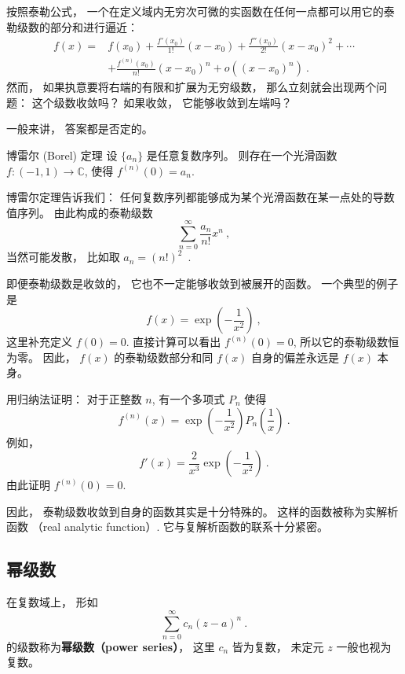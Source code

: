 

按照泰勒公式， 一个在定义域内无穷次可微的实函数在任何一点都可以用它的泰勒级数的部分和进行逼近：
$$
\begin{aligned}
f(x)=&f(x_0)+\frac{f'(x_0)}{1!}(x-x_0)+\frac{f''(x_0)}{2!}(x-x_0)^2+\cdots\\
&+\frac{f^{(n)}(x_0)}{n!}(x-x_0)^n+o((x-x_0)^n)~.
\end{aligned}
$$
然而， 如果执意要将右端的有限和扩展为无穷级数， 那么立刻就会出现两个问题： 这个级数收敛吗？ 如果收敛， 它能够收敛到左端吗？

一般来讲， 答案都是否定的。 

\begin{theorem}{博雷尔 (Borel) 定理}
设 $\{a_n\}$ 是任意复数序列。 则存在一个光滑函数 $f:(-1,1)\to\mathbb{C}$, 使得 $f^{(n)}(0)=a_n$.
\end{theorem}
博雷尔定理告诉我们： 任何复数序列都能够成为某个光滑函数在某一点处的导数值序列。 由此构成的泰勒级数
$$
\sum_{n=0}^\infty\frac{a_n}{n!}x^n~,
$$
当然可能发散， 比如取 $a_n=(n!)^2$~.

即便泰勒级数是收敛的， 它也不一定能够收敛到被展开的函数。 一个典型的例子是
$$
f(x)=\exp\left(-\frac{1}{x^2}\right)~,
$$
这里补充定义 $f(0)=0$. 直接计算可以看出 $f^{(n)}(0)=0$, 所以它的泰勒级数恒为零。 因此， $f(x)$ 的泰勒级数部分和同 $f(x)$ 自身的偏差永远是 $f(x)$ 本身。

\begin{exercise}{}
用归纳法证明： 对于正整数 $n$, 有一个多项式 $P_n$ 使得
$$
f^{(n)}(x)=\exp\left(-\frac{1}{x^2}\right)P_n\left(\frac{1}{x}\right)~.
$$
例如， 
$$
f'(x)=\frac{2}{x^3}\exp\left(-\frac{1}{x^2}\right)~.
$$
由此证明 $f^{(n)}(0)=0$.
\end{exercise}

因此， 泰勒级数收敛到自身的函数其实是十分特殊的。 这样的函数被称为实解析函数 （real analytic function）. 它与复解析函数的联系十分紧密。

\subsection{幂级数}
在复数域上， 形如
\begin{equation}
\sum_{n=0}^\infty c_n(z-a)^n~.
\end{equation}
的级数称为\textbf{幂级数（power series）}， 这里 $c_n$ 皆为复数， 未定元 $z$ 一般也视为复数。 


